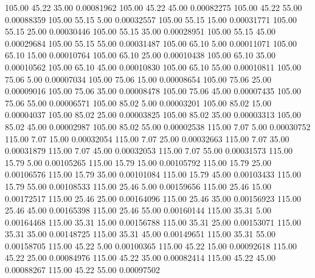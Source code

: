     105.00     45.22     35.00     0.00081962
    105.00     45.22     45.00     0.00082275
    105.00     45.22     55.00     0.00088359
    105.00     55.15      5.00     0.00032557
    105.00     55.15     15.00     0.00031771
    105.00     55.15     25.00     0.00030446
    105.00     55.15     35.00     0.00028951
    105.00     55.15     45.00     0.00029684
    105.00     55.15     55.00     0.00031487
    105.00     65.10      5.00     0.00011071
    105.00     65.10     15.00     0.00010764
    105.00     65.10     25.00     0.00010438
    105.00     65.10     35.00     0.00010562
    105.00     65.10     45.00     0.00010830
    105.00     65.10     55.00     0.00010811
    105.00     75.06      5.00     0.00007034
    105.00     75.06     15.00     0.00008654
    105.00     75.06     25.00     0.00009016
    105.00     75.06     35.00     0.00008478
    105.00     75.06     45.00     0.00007435
    105.00     75.06     55.00     0.00006571
    105.00     85.02      5.00     0.00003201
    105.00     85.02     15.00     0.00004037
    105.00     85.02     25.00     0.00003825
    105.00     85.02     35.00     0.00003313
    105.00     85.02     45.00     0.00002987
    105.00     85.02     55.00     0.00002538
    115.00      7.07      5.00     0.00030752
    115.00      7.07     15.00     0.00032054
    115.00      7.07     25.00     0.00032663
    115.00      7.07     35.00     0.00031879
    115.00      7.07     45.00     0.00032053
    115.00      7.07     55.00     0.00031573
    115.00     15.79      5.00     0.00105265
    115.00     15.79     15.00     0.00105792
    115.00     15.79     25.00     0.00106576
    115.00     15.79     35.00     0.00101084
    115.00     15.79     45.00     0.00103433
    115.00     15.79     55.00     0.00108533
    115.00     25.46      5.00     0.00159656
    115.00     25.46     15.00     0.00172517
    115.00     25.46     25.00     0.00164096
    115.00     25.46     35.00     0.00156923
    115.00     25.46     45.00     0.00165398
    115.00     25.46     55.00     0.00160144
    115.00     35.31      5.00     0.00164468
    115.00     35.31     15.00     0.00156788
    115.00     35.31     25.00     0.00153071
    115.00     35.31     35.00     0.00148725
    115.00     35.31     45.00     0.00149651
    115.00     35.31     55.00     0.00158705
    115.00     45.22      5.00     0.00100365
    115.00     45.22     15.00     0.00092618
    115.00     45.22     25.00     0.00084976
    115.00     45.22     35.00     0.00082414
    115.00     45.22     45.00     0.00088267
    115.00     45.22     55.00     0.00097502
